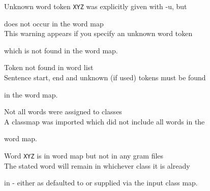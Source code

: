 \begin{itemize}
\begin{itemize}
 Unknown word token {\tt XYZ} was explicitly given with -u, but


          does not occur in the word map\\


        This warning appears if you specify an unknown word token


          which is not found in the word map.





 Token not found in word list\\


        Sentence start, end and unknown (if used) tokens must be found


        in the word map.





 Not all words were assigned to classes\\


        A classmap was imported which did not include all words in the


        word map.





 Word {\tt XYZ} is in word map but not in any gram files\\


        The stated word will remain in whichever class it is already


        in - either as defaulted to or supplied via the input class map.


\end{itemize}








\end{itemize}
















